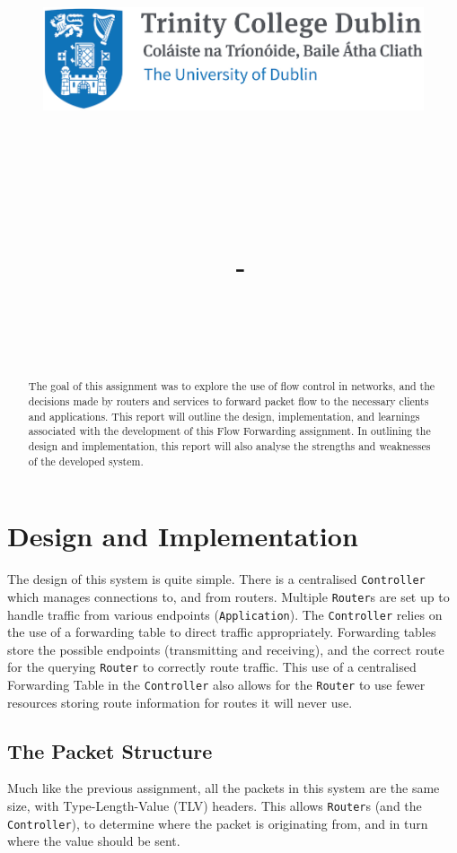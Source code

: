 \documentclass{article}
\title{
    \vspace{-1in}
    \begin{figure}[!ht]
    \flushleft
    \includegraphics[width=0.4\linewidth]{reduced-trinity.png}
    \end{figure}
    \vspace{-0.5cm}
    \hrulefill \\
    \vspace{1cm}
    \textmd{\textbf{\moduleCode\ \moduleName}}\\
    \textmd{\textbf{\assignmentTitle}}\\
    \textmd{\authorName\ - \authorID}\\
    \textmd{\reportDate}\\
    \vspace{0.5cm}
    \hrulefill \\
}
\date{}
\author{}
\newcommand{\code}[1]{\colorbox{light-gray}{\texttt{#1}}}
\begin{document}
    \lstset{language=bash, float=h, captionpos=b, frame=single, numbers=left, numberblanklines=false, numberstyle=\tiny, numbersep=1mm, framexleftmargin=3mm, xleftmargin=5mm, aboveskip=3mm, breaklines=true}
    \captionsetup{width=.8\linewidth} 

    \maketitle
    \begin{abstract}
        The goal of this assignment was to explore the use of flow control in networks, and the decisions made by routers and services to forward packet flow to the necessary clients and applications. This report will outline the design, implementation, and learnings associated with the development of this Flow Forwarding assignment. In outlining the design and implementation, this report will also analyse the strengths and weaknesses of the developed system.
    \end{abstract}
    \tableofcontents
    \newpage
    
    \section{Design and Implementation}
    \label{sec:Design}
    The design of this system is quite simple. There is a centralised \code{Controller} which manages connections to, and from routers. Multiple \code{Router}s are set up to handle traffic from various endpoints (\code{Application}). The \code{Controller} relies on the use of a forwarding table to direct traffic appropriately. Forwarding tables store the possible endpoints (transmitting and receiving), and the correct route for the querying \code{Router} to correctly route traffic. This use of a centralised Forwarding Table in the \code{Controller} also allows for the \code{Router} to use fewer resources storing route information for routes it will never use. 

    \subsection{The Packet Structure}
    \label{subsec:PacketStructure}
    Much like the previous assignment, all the packets in this system are the same size, with Type-Length-Value (TLV) headers. This allows \code{Router}s (and the \code{Controller}), to determine where the packet is originating from, and in turn where the value should be sent.
    
\end{document}
